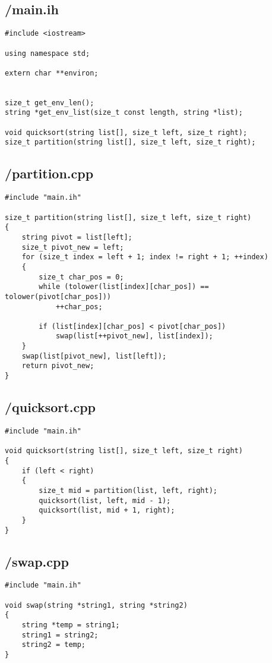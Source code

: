 \documentclass{article}
\begin{document}
\subsection*{/main.ih}
\begin{verbatim}
#include <iostream>

using namespace std;

extern char **environ;


size_t get_env_len();
string *get_env_list(size_t const length, string *list);

void quicksort(string list[], size_t left, size_t right);
size_t partition(string list[], size_t left, size_t right);

\end{verbatim}
\subsection*{/partition.cpp}
\begin{verbatim}
#include "main.ih"

size_t partition(string list[], size_t left, size_t right)
{
    string pivot = list[left];
    size_t pivot_new = left;
    for (size_t index = left + 1; index != right + 1; ++index)
    {
        size_t char_pos = 0;
        while (tolower(list[index][char_pos]) == tolower(pivot[char_pos]))
            ++char_pos;

        if (list[index][char_pos] < pivot[char_pos])
            swap(list[++pivot_new], list[index]);
    }
    swap(list[pivot_new], list[left]);
    return pivot_new;
}
\end{verbatim}
\subsection*{/quicksort.cpp}
\begin{verbatim}
#include "main.ih"

void quicksort(string list[], size_t left, size_t right)
{
    if (left < right)
    {
        size_t mid = partition(list, left, right);
        quicksort(list, left, mid - 1);
        quicksort(list, mid + 1, right);
    }
}
\end{verbatim}
\subsection*{/swap.cpp}
\begin{verbatim}
#include "main.ih"

void swap(string *string1, string *string2)
{
    string *temp = string1;
    string1 = string2;
    string2 = temp;
}
\end{verbatim}
\end{document}
